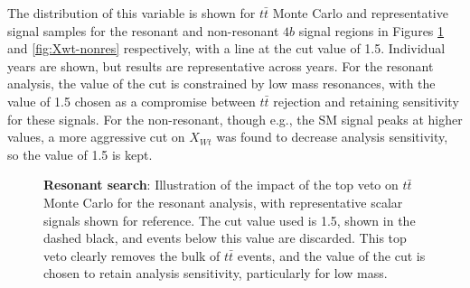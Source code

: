 The distribution of this variable is shown for $t\bar{t}$ Monte Carlo and representative signal 
samples for the resonant and non-resonant $4b$ signal regions in Figures \ref{fig:Xwt-res} and 
\ref{fig:Xwt-nonres} respectively, with a line at the cut value of 1.5. Individual years are shown, 
but results are representative across years. For the resonant analysis, the value of the cut is 
constrained by low mass resonances, with the value of 1.5 chosen as a compromise between $t\bar{t}$ 
rejection and retaining sensitivity for these signals. For the non-resonant, though e.g., the SM signal 
peaks at higher values, a more aggressive cut on $X_{Wt}$ was found to decrease analysis sensitivity, 
so the value of 1.5 is kept.
\begin{figure}
\centering
{}
\caption{\label{fig:Xwt-res} \textbf{Resonant search}: Illustration of the impact of the top veto on $t\bar{t}$ 
Monte Carlo for the resonant analysis, with representative scalar signals shown for reference. The cut value 
used is 1.5, shown in the dashed black, and events below this value are discarded. This top veto clearly removes 
the bulk of $t\bar{t}$ events, and the value of the cut is chosen to retain analysis sensitivity, particularly for 
low mass.}
\end{figure}


